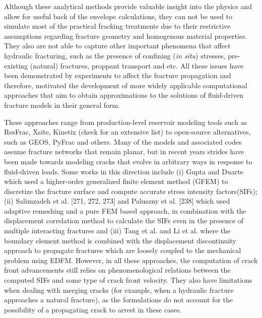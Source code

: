     Although these analytical methods provide valuable insight into the physics and allow for useful back of the envelope calculations, they can not be used to simulate most of the practical fracking treatments due to their restrictive assumptions regarding fracture geometry and homogenous material properties. They also are not able to capture other important phenomena that affect hydraulic fracturing, such as the presence of confining (\textit{in situ}) stresses, pre-existing (natural) fractures, proppant transport and etc.
    All these issues have been demonstrated by experiments to affect the fracture propagation and therefore, motivated the development of more widely applicable computational approaches that aim to obtain approximations to the solutions of fluid-driven fracture models in their general form.

    These approaches range from production-level reservoir modeling tools such as ResFrac\cite{mcclure2017three, mcclure2018resfrac}, Xsite\cite{itasca}, Kinetix\cite{kinetix,kinetixforpetrel} (check \cite{chen2021review} for an extensive list) to open-source alternatives, such as GEOS\cite{settgast2012simulation, settgast2014simulation, settgast2017fully}, PyFrac\cite{zia2020pyfrac} and others. Many of the models and associated codes assume fracture networks that remain planar, but in recent years strides have been made towards modeling cracks that evolve in arbitrary ways in response to fluid-driven loads. Some works in this direction include (i) Gupta and Duarte \cite{gupta2014simulation, gupta2018coupled} which used a higher-order generalized finite element method (GFEM) to discretize the fracture surface and compute accurate stress intensity factors(SIFs); (ii) Salimzadeh et al. [271, 272, 273] and Paluszny et al. [238] which used adaptive remeshing and a pure FEM based approach, in combination with the displacement correlation method to calculate the SIFs even in the presence of multiple interacting fractures and (iii) Tang et al. \cite{tang2019analysis} and Li et al. \cite{li2020hydromechanical,li2021development} where the boundary element method is combined with the displacement discontinuity approach to propagate fractures which are loosely coupled to the mechanical problem using EDFM\cite{hajibeygi2011hierarchical}. However, in all these approaches, the computation of crack front advancements still relies on phenomenological relations between the computed SIFs and some type of crack front velocity. They also have limitations when dealing with merging cracks (for example, when a hydraulic fracture approaches a natural fracture), as the formulations do not account for the possibility of a propagating crack to arrest in these cases.
    
